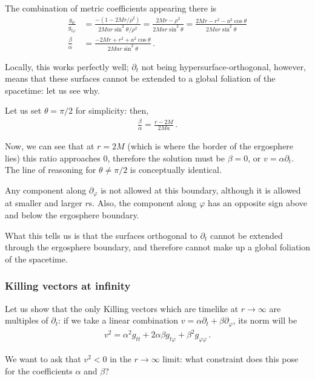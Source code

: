 \documentclass[main.tex]{subfiles}
\begin{document}
The combination of metric coefficients appearing there is %
\begin{align}
\frac{g_{tt}}{g_{t \varphi }} &= 
\frac{- (1 - 2Mr / \rho^2)}{2Mar \sin^2 \theta / \rho^2} = \frac{2Mr - \rho^2}{2Mar \sin^2\theta } = \frac{2Mr - r^2 - a^2 \cos \theta }{2Mar \sin^2 \theta }  \\
\frac{\beta }{\alpha} &= \frac{ -2Mr + r^2 + a^2 \cos \theta}{2Mar \sin^2 \theta }
\,.
\end{align}

Locally, this works perfectly well; \(\partial_t\) not being hypersurface-orthogonal, however, 
means that these surfaces cannot be extended to a global foliation of the spacetime: let us see why. 

Let us set \(\theta = \pi /2\) for simplicity: then, 
%
\begin{align}
\frac{\beta }{\alpha} = \frac{r - 2M}{2Ma}
\,.
\end{align}

Now, we can see that at \(r = 2M\) (which is where the border of the ergosphere lies) this ratio approaches 0, therefore the 
solution must be \(\beta = 0\), or \(v = \alpha \partial_t\).
The line of reasoning for \(\theta \neq \pi /2 \) is conceptually identical.

Any component along \(\partial_\varphi\) is not allowed at this boundary, although it is allowed at smaller and larger \(r\)s.
Also, the component along \(\varphi \) has an opposite sign above and below the ergosphere boundary. 

What this tells us is that the surfaces orthogonal to \(\partial_t\) cannot be extended through the ergosphere boundary, and therefore cannot make up a global foliation of the spacetime.

\subsubsection{Killing vectors at infinity}

Let us show that the only Killing vectors which are timelike at \(r \to \infty \) are multiples of \(\partial_t\): if we take a linear combination \(v = \alpha \partial_t + \beta \partial_\varphi\), its norm will be 
%
\begin{align}
v^2 = \alpha^2 g_{tt} + 2 \alpha \beta g_{t \varphi } + \beta^2 g_{\varphi \varphi }
\,.
\end{align}

We want to ask that \(v^2 < 0\) in the \(r \to \infty \) limit: what constraint does this pose for the coefficients \(\alpha \) and \(\beta \)? 
\end{document}
